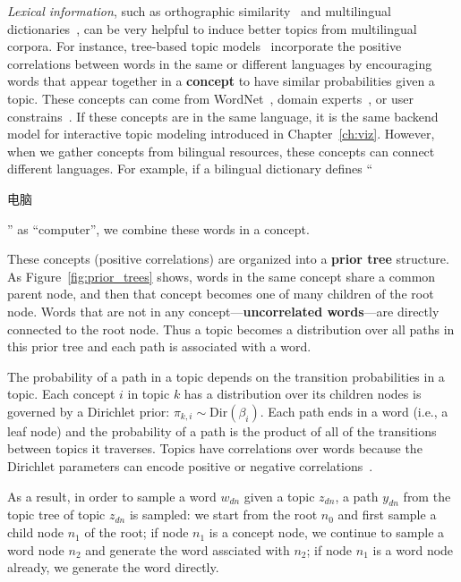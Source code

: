 \emph{Lexical information}, such as orthographic similarity~\citep{boyd-graber-09} and multilingual dictionaries~\citep{boyd-graber-10}, can be very helpful to induce better topics from multilingual corpora. For instance, tree-based topic models~\citep[\tlda{}]{boyd-graber-07,andrzejewski-09,hu-14:itm} incorporate the positive correlations between words in the same or different languages by encouraging words that appear together in a {\bf concept} to have similar probabilities given a topic. These concepts can come from WordNet~\citep{boyd-graber-10}, domain experts~\citep{andrzejewski-09}, or user constrains~\citep{hu-14:itm}. If these concepts are in the same language, it is the same backend model for interactive topic modeling introduced in Chapter~\ref{ch:viz}. However, when we gather concepts from bilingual resources, these concepts can connect different languages. For example, if a bilingual dictionary defines ``\begin{CJK*}{UTF8}{gbsn}电脑\end{CJK*}'' as ``computer'', we combine these words in a concept.

These concepts (positive correlations) are organized into a {\bf prior tree} structure. As Figure~\ref{fig:prior_trees} shows, words in the same concept share a common parent node, and then that concept becomes one of many children of the root node.  Words that are not in any concept---{\bf uncorrelated words}---are directly connected to the root node. Thus a topic becomes a distribution over all paths in this prior tree and each path is associated with a word. 

The probability of a path in a topic depends on the transition probabilities in a topic.  Each concept $i$ in topic $k$ has a distribution over its children nodes is governed by a Dirichlet prior: $\pi_{k,i} \sim \text{Dir}(\beta_{i})$.  Each path ends in a word (i.e., a leaf node) and the probability of a path is the product of all of the transitions between topics it traverses. Topics have correlations over words because the Dirichlet parameters can encode positive or negative correlations~\citep{andrzejewski-09}.

As a result, in order to sample a word $w_{dn}$ given a topic $z_{dn}$, a path $y_{dn}$ from the topic tree of topic $z_{dn}$ is sampled: we start from the root $n_0$ and first sample a child node $n_1$ of the root; if node $n_1$ is a concept node, we continue to sample a word node $n_2$ and generate the word assciated with $n_2$; if node $n_1$ is a word node already, we generate the word directly.

